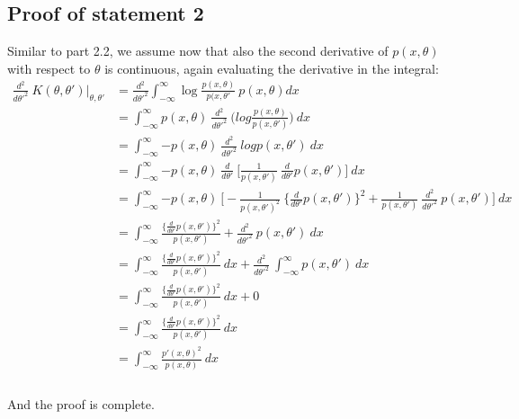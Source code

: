 \documentclass[paper=a4, fontsize=11pt]{scrartcl} %
\numberwithin{equation}{section} %
\numberwithin{figure}{section} %
\numberwithin{table}{section} %
\begin{document}
\subsection{Proof of statement 2}
Similar to part 2.2, we assume now that also the second derivative of $p(x,\theta)$ with respect to $\theta$ is continuous, again evaluating the derivative in the integral:
\begin{equation}
\begin{aligned} 
	\frac{d^2}{d\theta'^2}\ K(\theta,\theta')|_{\theta,\theta'} &= \frac{d^2}{d\theta'^2} \int_{-\infty}^{\infty}{\log{\frac{p(x,\theta)}{p(x,\theta'}}\ p(x, \theta)dx} \\
	&= \int_{-\infty}^{\infty}{p(x, \theta)\ \frac{d^2}{d\theta'^2}\ \Bigg(log{\frac{p(x,\theta)}{p(x,\theta')}}\Bigg)\ dx} \\
	&= \int_{-\infty}^{\infty}{-p(x, \theta)\ \frac{d^2}{d\theta'^2}\ log{p(x,\theta')}\ dx} \\
	&= \int_{-\infty}^{\infty}{-p(x, \theta)\ \frac{d}{d\theta'}\ \Bigg[ \frac{1}{p(x,\theta')}\ \frac{d}{d\theta'} p(x,\theta')\Bigg]\ dx} \\
	&= \int_{-\infty}^{\infty}{-p(x, \theta)\ \Bigg[ -\frac{1}{p(x,\theta')^2}\ \Bigg\{ \frac{d}{d\theta'} p(x,\theta') \Bigg\}^2  +  \frac{1}{p(x,\theta')}\  \frac{d^2}{d\theta'^2}\ p(x,\theta') \Bigg]\ dx} \\
	&= \int_{-\infty}^{\infty}{\frac{\Bigg\{ \frac{d}{d\theta'} p(x,\theta') \Bigg\}^2}{p(x,\theta')}  +  \frac{d^2}{d\theta'^2}\ p(x,\theta')\ dx} \\
	&= \int_{-\infty}^{\infty}{\frac{\Bigg\{ \frac{d}{d\theta'} p(x,\theta') \Bigg\}^2}{p(x,\theta')}\ dx}  +  \frac{d^2}{d\theta'^2}\ \int_{-\infty}^{\infty}{p(x,\theta')\ dx} \\
	&= \int_{-\infty}^{\infty}{\frac{\Bigg\{ \frac{d}{d\theta'} p(x,\theta') \Bigg\}^2}{p(x,\theta')}\ dx}  + 0 \\
	&= \int_{-\infty}^{\infty}{\frac{\Bigg\{ \frac{d}{d\theta'} p(x,\theta') \Bigg\}^2}{p(x,\theta')}\ dx} \\
	&= \int_{-\infty}^{\infty}{\frac{p'(x, \theta)^2}{p(x, \theta)}\ dx} \\
\end{aligned}
\end{equation}
\\
And the proof is complete.
\end{document}
